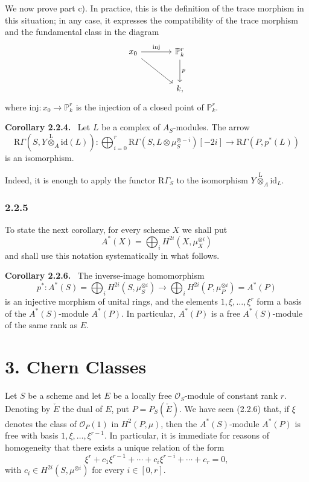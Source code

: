 \documentclass[11pt]{article}
\newenvironment{statement}[1]{\par\medskip\noindent\textbf{#1.}\ }{\par\medskip}
\providecommand{\lten}{\overset{\mathrm L}{\otimes}}
\providecommand{\lten}{\overset{\mathrm L}{\otimes}}
\providecommand{\lten}{\overset{\mathrm L}{\otimes}}
\providecommand{\lten}{\overset{\mathrm L}{\otimes}}
\providecommand{\lten}{\overset{\mathrm L}{\otimes}}
\providecommand{\lten}{\overset{\mathrm L}{\otimes}}
\providecommand{\lten}{\overset{\mathrm L}{\otimes}}
\begin{document}
We now prove part c). In practice, this is the definition of the trace morphism in this situation; in any case, it expresses the compatibility of the trace morphism and the fundamental class in the diagram
\[
\begin{tikzcd}[column sep=large,row sep=large]
x_0 \arrow[r,"\mathrm{inj}"] \arrow[dr] & \mathbb P^r_k \arrow[d,"p"]\\
& k ,
\end{tikzcd}
\]
where $\mathrm{inj}:x_0\to \mathbb P^r_k$ is the injection of a closed point of $\mathbb P^r_k$.

\begin{statement}{Corollary 2.2.4}
Let $L$ be a complex of $A_S$-modules. The arrow
\[
\mathrm R\Gamma(S,Y\lten_A\mathrm{id}(L)):
\bigoplus_{i=0}^r \mathrm R\Gamma(S,L\otimes\mu_S^{\otimes -i})[-2i]
\longrightarrow
\mathrm R\Gamma(P,p^*(L))
\]
is an isomorphism.
\end{statement}

Indeed, it is enough to apply the functor $\mathrm R\Gamma_S$ to the isomorphism $Y\lten_A\mathrm{id}_L$.

\subsubsection*{2.2.5}
To state the next corollary, for every scheme $X$ we shall put
\[
A^*(X)=\bigoplus_i H^{2i}(X,\mu_X^{\otimes i})
\]
and shall use this notation systematically in what follows.

\begin{statement}{Corollary 2.2.6}
The inverse-image homomorphism
\[
p^*:A^*(S)=\bigoplus_i H^{2i}(S,\mu_S^{\otimes i})
\longrightarrow
\bigoplus_i H^{2i}(P,\mu_P^{\otimes i})=A^*(P)
\]
is an injective morphism of unital rings, and the elements $1,\xi,\ldots,\xi^r$ form a basis of the $A^*(S)$-module $A^*(P)$. In particular, $A^*(P)$ is a free $A^*(S)$-module of the same rank as $E$.
\end{statement}

\section*{3. Chern Classes}

Let $S$ be a scheme and let $E$ be a locally free $\mathcal O_S$-module of constant rank $r$. Denoting by $\check E$ the dual of $E$, put $P=P_S(\check E)$. We have seen (2.2.6) that, if $\xi$ denotes the class of $\mathcal O_P(1)$ in $H^2(P,\mu)$, then the $A^*(S)$-module $A^*(P)$ is free with basis $1,\xi,\ldots,\xi^{r-1}$. In particular, it is immediate for reasons of homogeneity that there exists a unique relation of the form
\[
\xi^r+c_1\xi^{r-1}+\cdots+c_i\xi^{r-i}+\cdots+c_r=0,
\tag{3.1}
\]
with $c_i\in H^{2i}(S,\mu^{\otimes i})$ for every $i\in[0,r]$.
\end{document}
